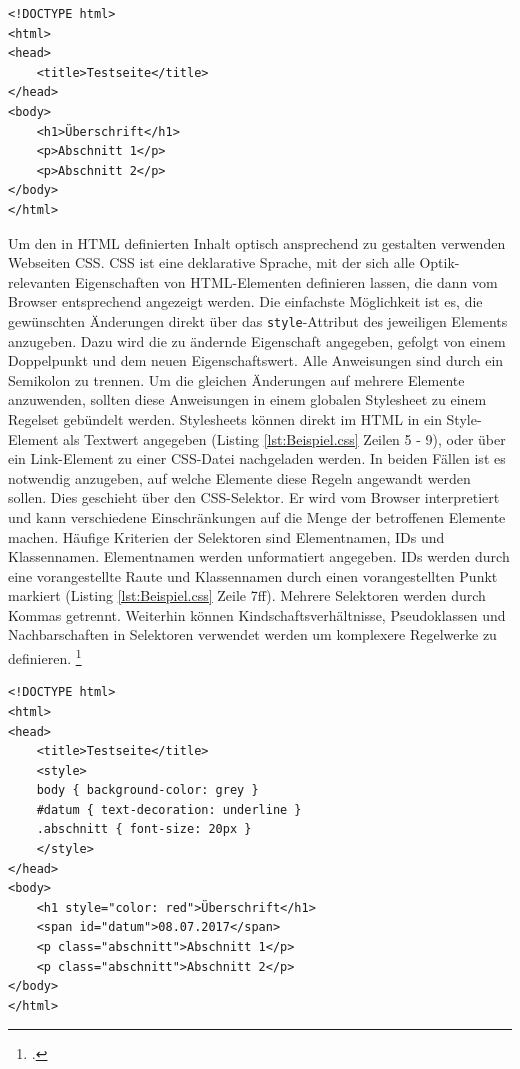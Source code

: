 \begin{scriptsize}
\begin{lstlisting}
<!DOCTYPE html>
<html>
<head>
	<title>Testseite</title>
</head>
<body>
	<h1>Überschrift</h1>
	<p>Abschnitt 1</p>
	<p>Abschnitt 2</p>
</body>
</html>
\end{lstlisting}
\end{scriptsize}

Um den in \ac{HTML} definierten Inhalt optisch ansprechend zu gestalten verwenden Webseiten \ac{CSS}.
\ac{CSS} ist eine deklarative Sprache, mit der sich alle Optik-relevanten Eigenschaften von \ac{HTML}-Elementen definieren lassen, die dann vom Browser entsprechend angezeigt werden.
Die einfachste Möglichkeit ist es, die gewünschten Änderungen direkt über das \lstinline[style=eclipse]{style}-Attribut des jeweiligen Elements anzugeben.
Dazu wird die zu ändernde Eigenschaft angegeben, gefolgt von einem Doppelpunkt und dem neuen
Eigenschaftswert.
Alle Anweisungen sind durch ein Semikolon zu trennen.
Um die gleichen Änderungen auf mehrere Elemente anzuwenden, sollten diese Anweisungen in einem globalen Stylesheet zu einem Regelset gebündelt werden.
Stylesheets können direkt im \ac{HTML} in ein Style-Element als Textwert angegeben
(Listing \ref{lst:Beispiel.css} Zeilen 5 - 9), oder über ein Link-Element zu einer
\ac{CSS}-Datei nachgeladen werden.
In beiden Fällen ist es notwendig anzugeben, auf welche Elemente diese Regeln angewandt werden sollen.
Dies geschieht über den \ac{CSS}-Selektor.
Er wird vom Browser interpretiert und kann verschiedene Einschränkungen auf die Menge der betroffenen Elemente machen.
Häufige Kriterien der Selektoren sind Elementnamen, IDs und Klassennamen.
Elementnamen werden unformatiert angegeben. IDs werden durch eine vorangestellte Raute und
Klassennamen durch einen vorangestellten Punkt markiert (Listing \ref{lst:Beispiel.css} Zeile
7ff).
Mehrere Selektoren werden durch Kommas getrennt.
Weiterhin können Kindschaftsverhältnisse, Pseudoklassen und Nachbarschaften in Selektoren verwendet werden um komplexere Regelwerke zu definieren.
\footcite[Vgl.][125\psq]{webTechnologies}

\begin{scriptsize}
\begin{lstlisting}
<!DOCTYPE html>
<html>
<head>
	<title>Testseite</title>
	<style>
	body { background-color: grey }
	#datum { text-decoration: underline }
	.abschnitt { font-size: 20px }
	</style>
</head>
<body>
	<h1 style="color: red">Überschrift</h1>
	<span id="datum">08.07.2017</span>
	<p class="abschnitt">Abschnitt 1</p>
	<p class="abschnitt">Abschnitt 2</p>
</body>
</html>
\end{lstlisting}
\end{scriptsize}

